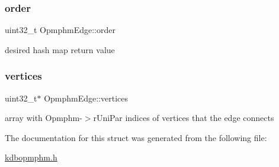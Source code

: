 \subsubsection{\texorpdfstring{order}{order}}
{\footnotesize\ttfamily uint32\+\_\+t Opmphm\+Edge\+::order}

desired hash map return value \mbox{\label{structOpmphmEdge_ae8d5721fe78750b17b5d4a9b8e3fc2b2}} 
\subsubsection{\texorpdfstring{vertices}{vertices}}
{\footnotesize\ttfamily uint32\+\_\+t$\ast$ Opmphm\+Edge\+::vertices}

array with Opmphm-\/$>$r\+Uni\+Par indices of vertices that the edge connects 

The documentation for this struct was generated from the following file\+:\begin{DoxyCompactItemize}
\item 
\hyperlink{kdbopmphm_8h}{kdbopmphm.\+h}\end{DoxyCompactItemize}
